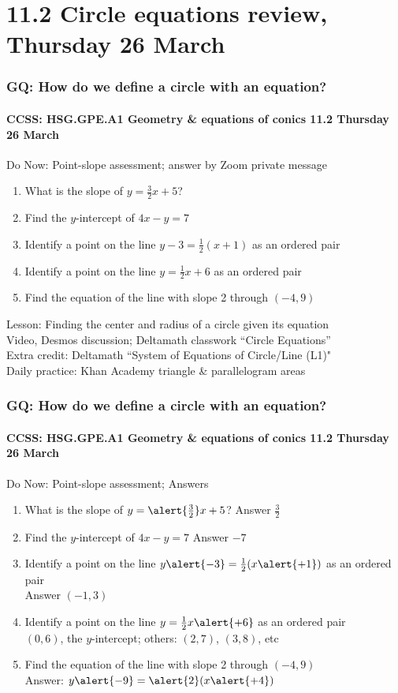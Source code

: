 \documentclass{beamer}
\begin{document}
\section{11.2 Circle equations review, Thursday 26 March} 
\frame
{
  \frametitle{GQ: How do we define a circle with an equation?}
  \framesubtitle{CCSS: HSG.GPE.A1 Geometry \& equations of conics \hfill \alert{11.2 Thursday 26 March}}

  \begin{block}{Do Now: Point-slope assessment; answer by Zoom private message}
    \begin{enumerate}
      \item What is the slope of $y=\frac{3}{2}x+5$?
      \item Find the $y$-intercept of $4x-y=7$
      \item Identify a point on the line $y-3=\frac{1}{2}(x+1)$ as an ordered pair
      \item Identify a point on the line $y=\frac{1}{2}x+6$ as an ordered pair
      \item Find the equation of the line with slope 2 through $(-4,9)$
    \end{enumerate}

    \end{block}
    Lesson: Finding the center and radius of a circle given its equation \\
    Video, Desmos discussion; Deltamath classwork ``Circle Equations''  \\
    Extra credit: Deltamath ``System of Equations of Circle/Line (L1)" \\[0.25cm]
    Daily practice: Khan Academy triangle \& parallelogram areas
}

\frame
{
  \frametitle{GQ: How do we define a circle with an equation?}
  \framesubtitle{CCSS: HSG.GPE.A1 Geometry \& equations of conics \hfill \alert{11.2 Thursday 26 March}}

  \begin{block}{Do Now: Point-slope assessment; \alert{Answers}}
    \begin{enumerate}
      \item What is the slope of $y=\alert{\frac{3}{2}}x+5$? \alert{Answer $\frac{3}{2}$}
      \item Find the $y$-intercept of $4x-y=7$ \alert{Answer $-7$}
      \item Identify a point on the line $y \alert{-3}=\frac{1}{2}(x \alert{+1})$ as an ordered pair \\
      \hspace{1cm} \alert{Answer $(-1,3)$}
      \item Identify a point on the line $y=\frac{1}{2}x \alert{+6}$ as an ordered pair \\
      \hspace{1cm} \alert{$(0,6)$, the $y$-intercept; others: $(2,7)$, $(3,8)$, etc}
      \item Find the equation of the line with slope 2 through $(-4,9)$ \\
      \hspace{1cm} \alert{Answer:} $y \alert{-9}=\alert{2}(x \alert{+4})$
    \end{enumerate}
    \end{block}
}
\end{document}

